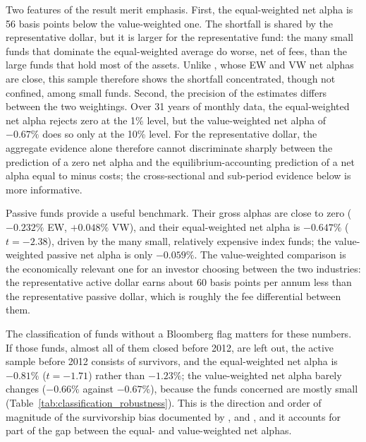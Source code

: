 \documentclass[12pt, oneside]{report}
\begin{document}
Two features of the result merit emphasis. First, the equal-weighted
net alpha is 56 basis points below the value-weighted one. The shortfall
is shared by the representative dollar, but it is larger for the
representative fund: the many small funds that dominate the
equal-weighted average do worse, net of fees, than the large funds that
hold most of the assets. Unlike \textcite{FamaFrench2010}, whose EW and VW
net alphas are close, this sample therefore shows the shortfall
concentrated, though not confined, among small funds. Second, the
precision of the estimates differs between the two weightings. Over 31
years of monthly data, the equal-weighted net alpha rejects zero at the
1\% level, but the value-weighted net alpha of $-0.67\%$ does so only at
the 10\% level. For the representative dollar, the aggregate evidence
alone therefore cannot discriminate sharply between the
\textcite{BerkGreen2004} prediction of a zero net alpha and the
equilibrium-accounting prediction of a net alpha equal to minus costs;
the cross-sectional and sub-period evidence below is more informative.

Passive funds provide a useful benchmark. Their gross alphas are close to
zero ($-0.232\%$ EW, $+0.048\%$ VW), and their equal-weighted net alpha is
$-0.647\%$ ($t = -2.38$), driven by the many small, relatively expensive
index funds; the value-weighted passive net alpha is only $-0.059\%$. The
value-weighted comparison is the economically relevant one for an
investor choosing between the two industries: the representative active
dollar earns about 60 basis points per annum less than the representative
passive dollar, which is roughly the fee differential between them.

The classification of funds without a Bloomberg flag matters for these
numbers. If those funds, almost all of them closed before 2012, are left
out, the active sample before 2012 consists of survivors, and the
equal-weighted net alpha is $-0.81\%$ ($t = -1.71$) rather than
$-1.23\%$; the value-weighted net alpha barely changes ($-0.66\%$ against
$-0.67\%$), because the funds concerned are mostly small
(Table~\ref{tab:classification_robustness}). This is the direction and
order of magnitude of the survivorship bias documented by
\textcite{BrownGoetzmannIbbotsonRoss1992},
\textcite{EltonGruberBlake1996} and
\textcite{CarhartCarpenterLynchMusto2002}, and it accounts for part of the
gap between the equal- and value-weighted net alphas.
\end{document}
